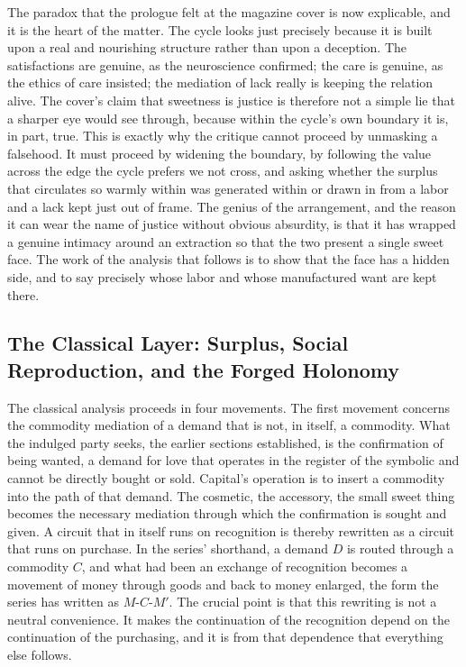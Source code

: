 \documentclass[11pt,a4paper]{article}
\begin{document}
The paradox that the prologue felt at the magazine cover is now explicable, and it is the heart of the matter. The cycle looks just precisely because it is built upon a real and nourishing structure rather than upon a deception. The satisfactions are genuine, as the neuroscience confirmed; the care is genuine, as the ethics of care insisted; the mediation of lack really is keeping the relation alive. The cover's claim that sweetness is justice is therefore not a simple lie that a sharper eye would see through, because within the cycle's own boundary it is, in part, true. This is exactly why the critique cannot proceed by unmasking a falsehood. It must proceed by widening the boundary, by following the value across the edge the cycle prefers we not cross, and asking whether the surplus that circulates so warmly within was generated within or drawn in from a labor and a lack kept just out of frame. The genius of the arrangement, and the reason it can wear the name of justice without obvious absurdity, is that it has wrapped a genuine intimacy around an extraction so that the two present a single sweet face. The work of the analysis that follows is to show that the face has a hidden side, and to say precisely whose labor and whose manufactured want are kept there.

\subsection{The Classical Layer: Surplus, Social Reproduction, and the Forged Holonomy}

The classical analysis proceeds in four movements. The first movement concerns the commodity mediation of a demand that is not, in itself, a commodity. What the indulged party seeks, the earlier sections established, is the confirmation of being wanted, a demand for love that operates in the register of the symbolic and cannot be directly bought or sold. Capital's operation is to insert a commodity into the path of that demand. The cosmetic, the accessory, the small sweet thing becomes the necessary mediation through which the confirmation is sought and given. A circuit that in itself runs on recognition is thereby rewritten as a circuit that runs on purchase. In the series' shorthand, a demand $D$ is routed through a commodity $C$, and what had been an exchange of recognition becomes a movement of money through goods and back to money enlarged, the form the series has written as $M$-$C$-$M'$. The crucial point is that this rewriting is not a neutral convenience. It makes the continuation of the recognition depend on the continuation of the purchasing, and it is from that dependence that everything else follows.
\end{document}
